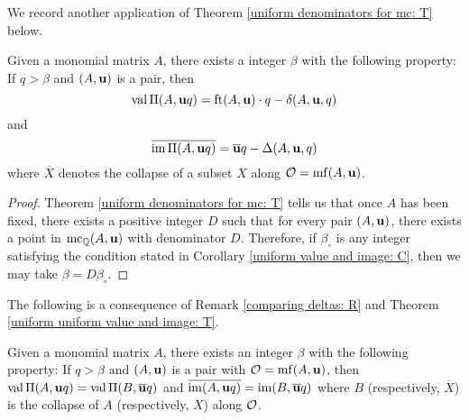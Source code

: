 \documentclass[11pt]{amsart}
\renewcommand{\!}[1]{{\color{red}\text{$\star$\,}#1\,$\star$}}
\newcommand{\ol}[1]{\overline{#1}}
\begin{document}
We record another application of Theorem \ref{uniform denominators for mc:  T} below.

\begin{theorem}
\label{uniform uniform value and image: T}
Given a monomial matrix $A$, there exists a integer $\beta$ with the following property:  If $q > \beta$ and $(A, \mathbf{u})$ is a pair, then \[ \operatorname{val} \Pi(A, \mathbf{u}q) = \operatorname{ft}(A, \mathbf{u}) \cdot q - \delta(A, \mathbf{u}, q) \] and
\[ \ol{ \im \IP(A, \vv{u}q)} = \ol{\vv{u}}q - \Delta(A, \vv{u},q) \] where $\ol{X}$ denotes the collapse of a subset $X$ along $\mathcal{O} = \operatorname{mf}(A, \mathbf{u})$.
\end{theorem}

\begin{proof}  
Theorem \ref{uniform denominators for mc:  T}  tells us that once $A$ has been fixed, there exists a positive integer $D$ such that for every pair $(A, \mathbf{u})$, there exists a point in $\operatorname{mc}_{\mathbb{Q}}(A, \mathbf{u})$ with denominator $D$.  Therefore, if $\beta_{\circ}$  is any integer satisfying the condition stated in Corollary \ref{uniform value and image: C}, then we may take $\beta = D \beta_{\circ}$.  
\end{proof}

The following is a consequence of Remark \ref{comparing deltas: R} and Theorem \ref{uniform uniform value and image: T}.

\begin{corollary}
Given a monomial matrix $A$, there exists an integer $\beta$ with the following property:  If $q > \beta$ and $(A, \mathbf{u})$ is a pair with $\mathcal{O} = \operatorname{mf}(A, \mathbf{u})$, then $\val \IP(A, \vv{u}q) = \val \IP(B, \ol{\vv{u}}q)$ and $\ol{ \im(A, \vv{u}q)} = \im(B, \ol{\vv{u}}q)$ where $B$ (respectively, $\ol{X}$) is the collapse of $A$  (respectively, $X$) along $\mathcal{O}$.
\end{corollary}



\newpage
\end{document}

